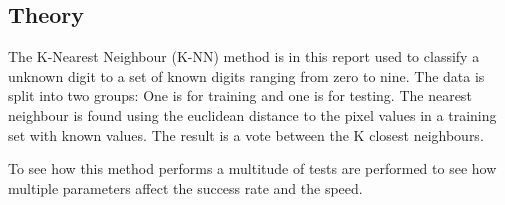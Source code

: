 \subsection{Theory}
The K-Nearest Neighbour (K-NN) method is in this report used to classify a unknown digit to a set of known digits ranging from zero to nine.
The data is split into two groups: One is for training and one is for testing. 
The nearest neighbour is found using the euclidean distance to the pixel values in a training set with known values.
The result is a vote between the K closest neighbours.

To see how this method performs a multitude of tests are performed to see how multiple parameters affect the success rate and the speed.


\begin{figure}[H]
\centering
{}
\end{figure}